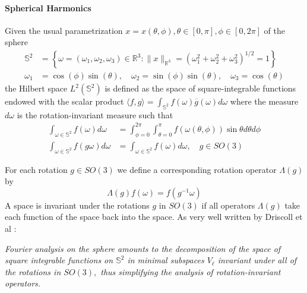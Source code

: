 \paragraph{Spherical Harmonics}
 Given the usual parametrization $x = x(\theta, \phi), \theta\in[0,\pi], \phi\in[0,2\pi]$ of the sphere
\begin{align*}
\mathbb{S}^{2}&=\left\{\omega=\left(\omega_{1}, \omega_{2}, \omega_{3}\right) \in \mathbb{R}^{3} :\|x\|_{\mathbb{R}^{3}}=\left(\omega_{1}^{2}+\omega_{2}^{2}+\omega_{3}^{2}\right)^{1 / 2}=1\right\}\\
\omega_{1}&=\cos (\phi) \sin (\theta), \quad \omega_{2}=\sin (\phi) \sin (\theta), \quad \omega_{3}=\cos (\theta)
\end{align*}
the Hilbert space $L^2(\mathbb S^2)$ is defined as the space of square-integrable functions endowed with the scalar product $\langle f,g\rangle=\int_{\mathbb S^2}f(\omega)\overline g(\omega)d\omega$ where the measure $d\omega$ is the rotation-invariant measure such that
\begin{align}
\int_{\omega \in \mathbb S^{2}} f(\omega) d \omega&=\int_{\phi=0}^{2 \pi} \int_{\theta=0}^{\pi} f(\omega(\theta, \phi)) \sin \theta d \theta d \phi\\
\int_{\omega \in \mathbb S^{2}} f(g \omega) d \omega&=\int_{\omega \in \mathbb S^{2}} f(\omega) d \omega, \quad g \in S O(3)
\end{align}

For each rotation $g\in SO(3)$ we define a corresponding rotation operator $\Lambda(g)$ by
$$
\Lambda(g) f(\omega)=f\left(g^{-1} \omega\right)
$$
A space is invariant under the rotations $g$ in $SO(3)$ if all operators $\Lambda(g)$ take each function of the space back into the space. As very well written by Driscoll et al \cite{Driscoll:1994:CFT:184069.184073}:

\vspace{0.2cm}
\textit{Fourier analysis on the sphere amounts to the decomposition of the space of square integrable functions on \(\mathbb S^{2}\) in minimal subspaces $V_\ell$ invariant under all of the rotations in \(S O(3),\) thus simplifying the analysis of rotation-invariant operators.}
\vspace{0.2cm}

